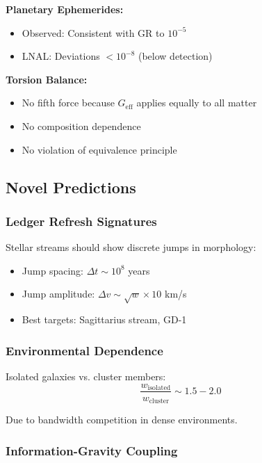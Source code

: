 \documentclass[12pt,letterpaper]{article}
\newcommand{\geff}{G_{\text{eff}}}
\begin{document}
\textbf{Planetary Ephemerides:}
\begin{itemize}
\item Observed: Consistent with GR to $10^{-5}$
\item LNAL: Deviations $< 10^{-8}$ (below detection)
\end{itemize}

\textbf{Torsion Balance:}
\begin{itemize}
\item No fifth force because $\geff$ applies equally to all matter
\item No composition dependence
\item No violation of equivalence principle
\end{itemize}

\subsection{Novel Predictions}

\subsubsection{Ledger Refresh Signatures}

Stellar streams should show discrete jumps in morphology:
\begin{itemize}
\item Jump spacing: $\Delta t \sim 10^8$ years
\item Jump amplitude: $\Delta v \sim \sqrt{w} \times 10$ km/s
\item Best targets: Sagittarius stream, GD-1
\end{itemize}

\subsubsection{Environmental Dependence}

Isolated galaxies vs. cluster members:
\begin{equation}
\frac{w_{\text{isolated}}}{w_{\text{cluster}}} \sim 1.5-2.0
\label{eq:env_ratio}
\end{equation}

Due to bandwidth competition in dense environments.

\subsubsection{Information-Gravity Coupling}
\end{document}
